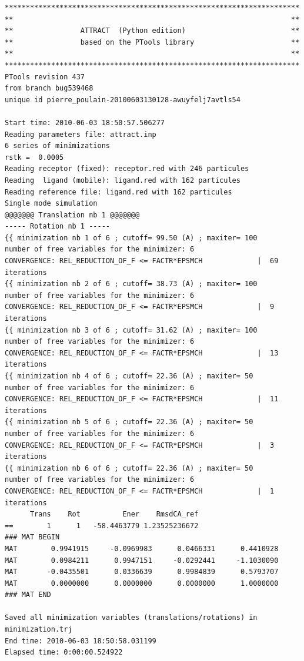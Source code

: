 \documentclass[12pt,a4paper]{article}
\begin{document}
\newpage
\linenumbers*
\begin{verbatim}
**********************************************************************
**                                                                  **
**                ATTRACT  (Python edition)                         **
**                based on the PTools library                       **
**                                                                  **
**********************************************************************
PTools revision 437
from branch bug539468
unique id pierre_poulain-20100603130128-awuyfelj7avtls54

Start time: 2010-06-03 18:50:57.506277
Reading parameters file: attract.inp
6 series of minimizations
rstk =  0.0005
Reading receptor (fixed): receptor.red with 246 particules
Reading  ligand (mobile): ligand.red with 162 particules
Reading reference file: ligand.red with 162 particules
Single mode simulation
@@@@@@@ Translation nb 1 @@@@@@@
----- Rotation nb 1 -----
{{ minimization nb 1 of 6 ; cutoff= 99.50 (A) ; maxiter= 100
number of free variables for the minimizer: 6
CONVERGENCE: REL_REDUCTION_OF_F <= FACTR*EPSMCH             |  69 iterations
{{ minimization nb 2 of 6 ; cutoff= 38.73 (A) ; maxiter= 100
number of free variables for the minimizer: 6
CONVERGENCE: REL_REDUCTION_OF_F <= FACTR*EPSMCH             |  9 iterations
{{ minimization nb 3 of 6 ; cutoff= 31.62 (A) ; maxiter= 100
number of free variables for the minimizer: 6
CONVERGENCE: REL_REDUCTION_OF_F <= FACTR*EPSMCH             |  13 iterations
{{ minimization nb 4 of 6 ; cutoff= 22.36 (A) ; maxiter= 50
number of free variables for the minimizer: 6
CONVERGENCE: REL_REDUCTION_OF_F <= FACTR*EPSMCH             |  11 iterations
{{ minimization nb 5 of 6 ; cutoff= 22.36 (A) ; maxiter= 50
number of free variables for the minimizer: 6
CONVERGENCE: REL_REDUCTION_OF_F <= FACTR*EPSMCH             |  3 iterations
{{ minimization nb 6 of 6 ; cutoff= 22.36 (A) ; maxiter= 50
number of free variables for the minimizer: 6
CONVERGENCE: REL_REDUCTION_OF_F <= FACTR*EPSMCH             |  1 iterations
      Trans    Rot          Ener    RmsdCA_ref
==        1      1   -58.4463779 1.23525236672
### MAT BEGIN
MAT        0.9941915     -0.0969983      0.0466331      0.4410928 
MAT        0.0984211      0.9947151     -0.0292441     -1.1030090 
MAT       -0.0435501      0.0336639      0.9984839      0.5793707 
MAT        0.0000000      0.0000000      0.0000000      1.0000000 
### MAT END

Saved all minimization variables (translations/rotations) in minimization.trj
End time: 2010-06-03 18:50:58.031199
Elapsed time: 0:00:00.524922
\end{verbatim}
\nolinenumbers
\end{document}
